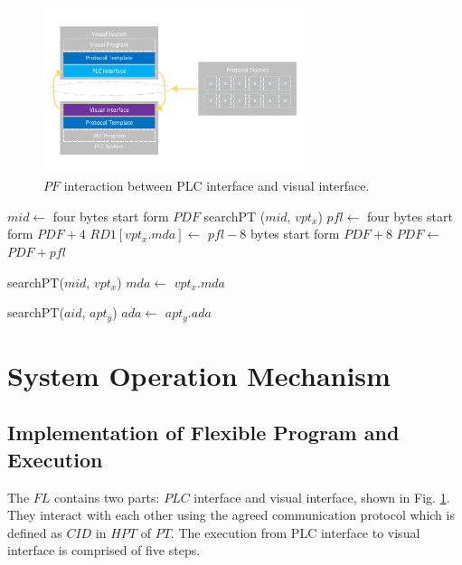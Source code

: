 \documentclass[journal,UTF8]{IEEEtran}
\begin{document}
\begin{figure}
	\centering
	\includegraphics[width=3in]{fig/FlexibleLayer.pdf}
	\caption{ $PF$ interaction between PLC interface and visual interface.}
	\label{fig:FlexibleLayer}
\end{figure}
\begin{algorithm}
	\label{alg4}
	\caption{$VLDeframing$}%
    $mid \leftarrow$ four bytes start form $PDF$\;
    searchPT ($mid$, $vpt_x$)\;
    $pfl \leftarrow$ four bytes start form $PDF+4$\; 
    $RD1[vpt_x.mda]\leftarrow$ $pfl-8$ bytes start form $PDF+8$\;     	
	$PDF\leftarrow$ $PDF+pfl$\;
\end{algorithm}

\begin{algorithm}
	\label{alg5}
	\caption{$CLDeframing$}%
	searchPT($mid$, $vpt_x$)\;
	$mda\leftarrow$ $vpt_x.mda$\;	
\end{algorithm}

\begin{algorithm}
	\label{alg6}
	\caption{$ALDeframing$}%
	searchPT($aid$, $apt_y$)\;
	$ada\leftarrow$ $apt_y.ada$\;
\end{algorithm}


\section{System Operation Mechanism}
\label{Execution}
\subsection{Implementation of Flexible Program and Execution}
The $FL$ contains two parts: $PLC$ interface and visual interface, shown in Fig. \ref{fig:FlexibleLayer}. They interact with each other using the agreed communication protocol which is defined as $CID$ in $HPT$ of $PT$. The execution from PLC interface to visual interface is comprised of five steps.  
\end{document}
